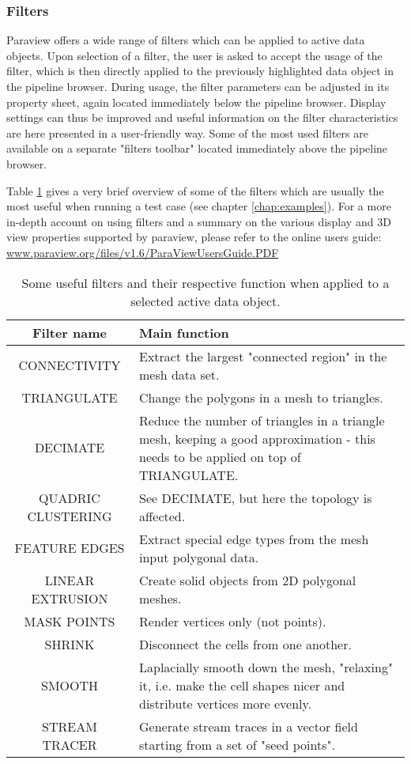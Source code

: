 \subsubsection{Filters}

Paraview offers a wide range of filters which can be applied to active data objects. Upon selection of a filter, the user is asked to accept the usage of the filter, which is then directly applied to the previously highlighted data object in the pipeline browser. During usage, the filter parameters can be adjusted in its property sheet, again located immediately below the pipeline browser. Display settings can thus be improved and useful information on the filter characteristics are here presented in a user-friendly way. Some of the most used filters are available on a separate "filters toolbar" located immediately above the pipeline browser.

Table \ref{ParaviewFilters} gives a very brief overview of some of the filters which are usually the most useful when running a test case (see chapter \ref{chap:examples}). For a more in-depth account on using filters and a summary on the various display and 3D view properties supported by paraview, please refer to the online users guide:
\url{www.paraview.org/files/v1.6/ParaViewUsersGuide.PDF}

\begin{center}
\begin{table}[h!]
\begin{tabular}{cp{110mm}}
{\bfseries Filter name} & {\bfseries\centering Main function} \\
\hline
CONNECTIVITY & Extract the largest "connected region" in the mesh data set. \\
TRIANGULATE & Change the polygons in a mesh to triangles. \\ 
DECIMATE & Reduce the number of triangles in a triangle mesh, keeping a good approximation - this needs to be applied on top of TRIANGULATE. \\
QUADRIC CLUSTERING & See DECIMATE, but here the topology is affected. \\
FEATURE EDGES & Extract special edge types from the mesh input polygonal data. \\
LINEAR EXTRUSION & Create solid objects from 2D polygonal meshes. \\
MASK POINTS & Render vertices only (not points). \\
SHRINK & Disconnect the cells from one another. \\
SMOOTH & Laplacially smooth down the mesh, "relaxing" it, i.e. make the cell shapes nicer and distribute vertices more evenly. \\
STREAM TRACER & Generate stream traces in a vector field starting from a set of "seed points". \\
\end{tabular}
\label{ParaviewFilters}
\caption{Some useful filters and their respective function when applied to a selected active data object.}
\end{table}
\end{center}




